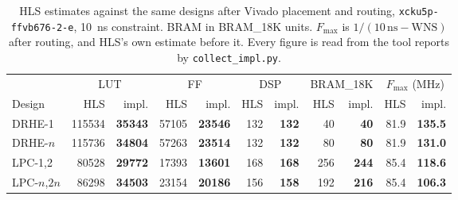 \begin{table}[htbp]
\centering
\caption[HLS estimates against implemented results]{HLS estimates against the same designs after Vivado placement and routing, \texttt{xcku5p-ffvb676-2-e}, \SI{10}{\nano\second} constraint. BRAM in BRAM\_18K units. $F_{\max}$ is $1/(10\,\mathrm{ns} - \mathrm{WNS})$ after routing, and HLS's own estimate before it. Every figure is read from the tool reports by \texttt{collect\_impl.py}.}
\label{tab:hlsvsimpl}
\small
\setlength{\tabcolsep}{3.5pt}
\begin{tabular}{@{}l rr rr rr rr rr@{}}
\toprule
& \multicolumn{2}{c}{LUT} & \multicolumn{2}{c}{FF} & \multicolumn{2}{c}{DSP} & \multicolumn{2}{c}{BRAM\_18K} & \multicolumn{2}{c}{$F_{\max}$ (MHz)}\\
\cmidrule(lr){2-3}\cmidrule(lr){4-5}\cmidrule(lr){6-7}\cmidrule(lr){8-9}\cmidrule(lr){10-11}
Design & HLS & impl. & HLS & impl. & HLS & impl. & HLS & impl. & HLS & impl.\\
\midrule
DRHE-1 & \num{115534} & \textbf{\num{35343}} & \num{57105} & \textbf{\num{23546}} & \num{132} & \textbf{\num{132}} & \num{40} & \textbf{\num{40}} & \num{81.9} & \textbf{\num{135.5}}\\
DRHE-$n$ & \num{115736} & \textbf{\num{34804}} & \num{57263} & \textbf{\num{23514}} & \num{132} & \textbf{\num{132}} & \num{80} & \textbf{\num{80}} & \num{81.9} & \textbf{\num{131.0}}\\
LPC-1,2 & \num{80528} & \textbf{\num{29772}} & \num{17393} & \textbf{\num{13601}} & \num{168} & \textbf{\num{168}} & \num{256} & \textbf{\num{244}} & \num{85.4} & \textbf{\num{118.6}}\\
LPC-$n$,$2n$ & \num{86298} & \textbf{\num{34503}} & \num{23154} & \textbf{\num{20186}} & \num{156} & \textbf{\num{158}} & \num{192} & \textbf{\num{216}} & \num{85.4} & \textbf{\num{106.3}}\\
\bottomrule
\end{tabular}
\end{table}
